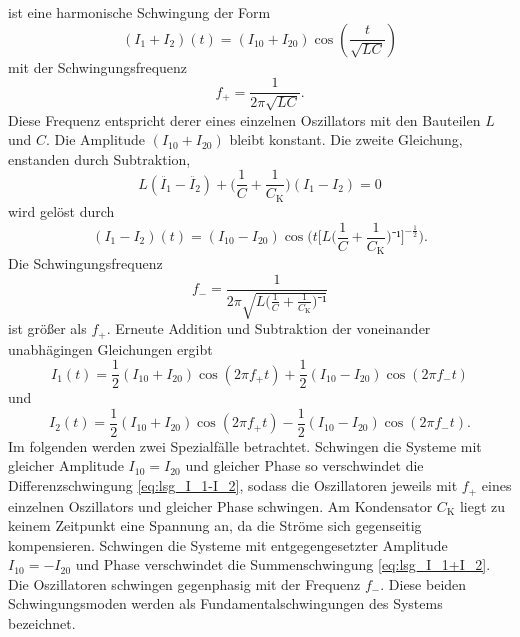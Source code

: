 ist eine harmonische Schwingung der Form
\begin{equation}
	({I_1}+{I_2})(t)=({I_{10}}+{I_{20}})\cos(\frac{t}{\sqrt{LC}})
\label{eq:lsg_I_1+I_2}
\end{equation}
mit der Schwingungsfrequenz 
\begin{equation}
f_+=\frac{1}{2\pi\sqrt{LC}}.
\label{eq:f_+}
\end{equation}
Diese Frequenz entspricht derer eines einzelnen Oszillators mit den Bauteilen $L$ und $C$.
 Die Amplitude $({I_10}+{I_20})$ bleibt konstant.
Die zweite Gleichung, enstanden durch Subtraktion,
\begin{equation}
	L(\ddot{I_1}-\ddot{I_2})+\bigl(\frac{1}{C}+\frac{1}{C_\mathup{K}}\bigr)({I_1}-{I_2})=0
	\label{eq:I_1-I_2}
\end{equation}
wird gelöst durch
\begin{equation}
	({I_1}-{I_2})(t)=({I_{10}}-{I_{20}})\cos\biggl(t{\biggl[L\biggl({\frac{1}{C}+\frac{1}{C_\mathup{K}}}\biggr)⁻¹\biggr]^{-\frac{1}{2}}}\biggr).
\label{lsg_I_1-I_2}
\end{equation}
Die Schwingungsfrequenz 
\begin{equation}
f_-=\frac{1}{2\pi\sqrt{L\bigl({\frac{1}{C}+\frac{1}{C_\mathup{K}}}\bigr)⁻¹}}
\label{eq:f_-}
\end{equation}
 ist größer als $f_+$.
Erneute Addition und Subtraktion der voneinander unabhägingen Gleichungen ergibt
\begin{equation}
	I_1(t)=\frac{1}{2}({I_{10}}+{I_{20}})\cos(2\pi f_+t)+\frac{1}{2}({I_{10}}-{I_{20}})\cos(2\pi f_-t)
	\label{eq:I_1_ur}
\end{equation}
und
\begin{equation}
	I_2(t)=\frac{1}{2}({I_{10}}+{I_{20}})\cos(2\pi f_+ t)-\frac{1}{2}({I_{10}}-{I_{20}})\cos(2\pi f_- t).
	\label{eq:I_2_ur}
\end{equation}
Im folgenden werden zwei Spezialfälle betrachtet. 
Schwingen die Systeme mit gleicher Amplitude $I_{10}=I_{20}$ und gleicher Phase so verschwindet die Differenzschwingung \eqref{eq:lsg_I_1-I_2}, sodass die Oszillatoren jeweils mit $f_+$ eines einzelnen Oszillators und gleicher Phase schwingen.
 Am Kondensator $C_\mathup{K}$ liegt zu keinem Zeitpunkt eine Spannung an, da die Ströme sich gegenseitig kompensieren.
Schwingen die Systeme mit entgegengesetzter Amplitude  $I_{10}=-I_{20}$ und Phase verschwindet die Summenschwingung \eqref{eq:lsg_I_1+I_2}. Die Oszillatoren schwingen gegenphasig mit der Frequenz $f_-$.
Diese beiden Schwingungsmoden werden als Fundamentalschwingungen des Systems bezeichnet.

